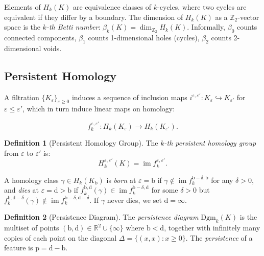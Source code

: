 \documentclass[12pt, a4paper]{report}
\newcommand{\Dgm}{\mathrm{Dgm}}
\newcommand{\birth}{\mathrm{b}}
\newcommand{\death}{\mathrm{d}}
\newcommand{\pers}{\mathrm{p}}
\newcommand{\Betti}{\beta}
\newcommand{\R}{\mathbb{R}}
\newcommand{\Z}{\mathbb{Z}}
\DeclareMathOperator{\im}{im}
\theoremstyle{definition}
\newtheorem{definition}{Definition}[chapter]
\theoremstyle{plain}
\theoremstyle{remark}
\begin{document}
Elements of $H_k(K)$ are equivalence classes of $k$-cycles, where
two cycles are equivalent if they differ by a boundary. The
dimension of $H_k(K)$ as a $\Z_2$-vector space is the \emph{$k$-th
Betti number}: $\Betti_k(K) = \dim_{\Z_2} H_k(K)$. Informally,
$\Betti_0$ counts connected components, $\Betti_1$ counts
1-dimensional holes (cycles), $\Betti_2$ counts 2-dimensional voids.

\subsection*{Persistent Homology}

A filtration $\{K_\varepsilon\}_{\varepsilon \ge 0}$ induces a
sequence of inclusion maps $i^{\varepsilon, \varepsilon'}:
K_\varepsilon \hookrightarrow K_{\varepsilon'}$ for $\varepsilon
\le \varepsilon'$, which in turn induce linear maps on homology:

\begin{equation}
  f_k^{\varepsilon, \varepsilon'}: H_k(K_\varepsilon) \to
  H_k(K_{\varepsilon'}).
  \label{eq:induced}
\end{equation}

\begin{definition}[Persistent Homology Group]
  The \emph{$k$-th persistent homology group} from $\varepsilon$ to
  $\varepsilon'$ is:
  \begin{equation}
    H_k^{\varepsilon, \varepsilon'}(K) =
    \im f_k^{\varepsilon, \varepsilon'}.
    \label{eq:persistent_group}
  \end{equation}
\end{definition}

A homology class $\gamma \in H_k(K_\birth)$ is \emph{born} at
$\varepsilon = \birth$ if $\gamma \notin \im f_k^{\birth-\delta,
\birth}$ for any $\delta > 0$, and \emph{dies} at $\varepsilon =
\death > \birth$ if $f_k^{\birth, \death}(\gamma) \in \im
f_k^{\birth-\delta, \death}$ for some $\delta > 0$ but $f_k^{\birth,
\death-\delta}(\gamma) \notin \im f_k^{\birth-\delta, \death-\delta}$.
If $\gamma$ never dies, we set $\death = \infty$.

\begin{definition}[Persistence Diagram]
  The \emph{persistence diagram} $\Dgm_k(K)$ is the multiset of
  points $(\birth, \death) \in \R^2 \cup \{\infty\}$ where
  $\birth < \death$, together with infinitely many copies of each
  point on the diagonal $\Delta = \{(x,x) : x \ge 0\}$. The
  \emph{persistence} of a feature is $\pers = \death - \birth$.
\end{definition}
\end{document}
